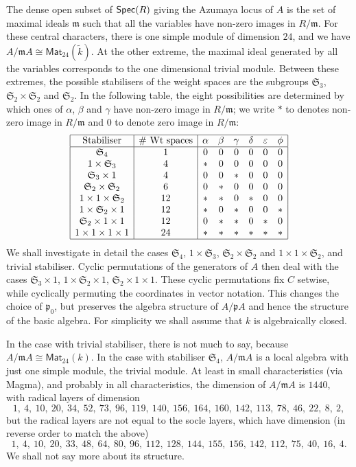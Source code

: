 \documentclass[12pt]{amsart}
\newcommand{\ep}{\varepsilon}
\newcommand{\Mat}{\mathsf{Mat}}
\newcommand{\Spec}{\operatorname{\sf Spec}}
\newcommand{\sym}[1]{\mathfrak{S}_{#1}}
\newcommand{\mfm}{\mathfrak{m}}
\newcommand{\mfp}{\mathfrak{p}}
\numberwithin{equation}{section}
\theoremstyle{definition}
\begin{document}
The dense open subset of $\Spec(R)$ giving the Azumaya locus of $A$ is
the set of maximal ideals $\mfm$ such that all the variables
have non-zero images in $R/\mfm$. For these central characters, there is one
simple module of dimension $24$, and we have $A/\mfm
A\cong\Mat_{24}(\tilde k)$. At the other extreme, the maximal ideal
generated by all the variables corresponds to the one dimensional
trivial module. Between these extremes, the possible stabilisers of
the weight spaces are the subgroups $\sym{3}$, 
$\sym{2}\times\sym{2}$ and $\sym{2}$. In the following table, the
eight possibilities are determined by which ones of $\alpha$, $\beta$
and $\gamma$ have non-zero image in $R/\mfm$; we write $*$ to denotes
non-zero image in $R/\mfm$ and $0$ to denote zero image in $R/\mfm$:
\[ \begin{array}{|c|c|cccccc|}
\hline
\text{Stabiliser}&\text{\# Wt spaces}&\alpha&\beta&\gamma&\delta&\ep&\phi\\ \hline
\sym{4}&1&0&0&0&0&0&0\\
1\times\sym{3}&4&*&0&0&0&0&0\\
\sym{3}\times1&4&0&0&*&0&0&0\\
\sym{2}\times\sym{2}&6&0&*&0&0&0&0\\
1\times1\times\sym{2}&12&*&*&0&*&0&0\\
1\times\sym{2}\times 1&12&*&0&*&0&0&*\\
\sym{2}\times 1\times 1&12&0&*&*&0&*&0\\
1\times1\times1\times1&24&*&*&*&*&*&*\\ \hline
\end{array} \]
We shall investigate in detail the cases $\sym{4}$, $1\times \sym{3}$,
$\sym{2}\times\sym{2}$ and $1\times 1 \times \sym{2}$, and trivial
stabiliser. Cyclic 
permutations of the generators of $A$ then deal with the cases
$\sym{3}\times 1$, $1\times \sym{2} \times 1$,  $\sym{2}\times
1\times 1$. These cyclic permutations fix $C$ setwise, while
cyclically permuting the coordinates in vector notation. This changes
the choice of $\mfp_0$, but preserves the algebra structure of $A/\mfp
A$ and hence the structure of the basic algebra. 
For simplicity we shall assume that $k$ is algebraically closed.\bigskip

In the case with 
trivial stabiliser, there is not much to say, because $A/\mfm
A\cong\Mat_{24}(k)$. In the case with stabiliser $\sym{4}$, $A/\mfm A$ is a
local algebra with just one simple module, the trivial module. At
least in small characteristics (via {\sc Magma}), and probably in all characteristics,
the dimension of $A/\mfm A$ is $1440$, with radical layers of dimension
\[ 1,\ 4,\ 10,\ 20,\ 34,\ 52,\ 73,\ 96,\ 119,\ 140,\ 156,\ 164,\ 160,\
  142,\ 113,\ 78,\ 46,\ 22,\ 8,\ 2, \]
 but the
radical layers are not equal to the socle layers, which have dimension 
(in reverse order to match the above)
\[  1 ,\ 4,\ 10,\ 20,\ 33,\ 48,\ 64,\ 80,\ 96,\ 112,\ 128,\ 
144,\ 155,\ 156,\ 142,\ 112,\ 75,\ 40,\ 16,\ 4. \]  
We shall not say more about its
structure.\bigskip
\end{document}

